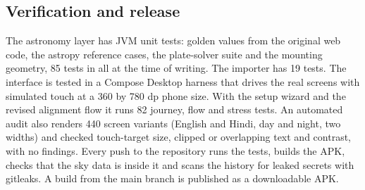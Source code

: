 \subsection{Verification and release}

The astronomy layer has JVM unit tests: golden values from the original web code, the astropy reference cases, the plate-solver suite and the mounting geometry, 85 tests in all at the time of writing. The importer has 19 tests. The interface is tested in a Compose Desktop harness that drives the real screens with simulated touch at a 360 by 780 dp phone size. With the setup wizard and the revised alignment flow it runs 82 journey, flow and stress tests. An automated audit also renders 440 screen variants (English and Hindi, day and night, two widths) and checked touch-target size, clipped or overlapping text and contrast, with no findings. Every push to the repository runs the tests, builds the APK, checks that the sky data is inside it and scans the history for leaked secrets with gitleaks. A build from the main branch is published as a downloadable APK.
